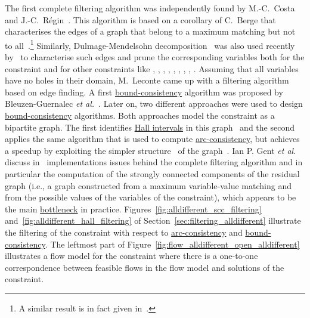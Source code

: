 \begin{ctrdesc}
\item[\pdfmarkup{subject={Algorithm},color=white,markup=Highlight}{Algorithm}{References (or short description) to the filtering algorithm attached to the constraint.}]
The first complete filtering algorithm was independently found by
M.-C.~Costa~\cite{Costa94} and J.-C.~R\'egin~\cite{Regin94}.
This algorithm is based on a corollary of C.~Berge that characterises
the edges of a graph that belong to a maximum
matching but not to all~\cite[page 120]{Berge70}.\footnote{A similar result
is in fact given in~\cite{Petersen1891}.}
Similarly, Dulmage-Mendelsohn decomposition~\cite{DulmageMendelsohn58}
was also used recently by~\cite{Cymer12,CymerPhD13} to characterise such edges and prune
the corresponding variables both for the  constraint
and for other constraints like
\hyperlink{Calldifferent_except_0}{},
\hyperlink{Ccorrespondence}{},
\hyperlink{Cinverse}{},
\hyperlink{Csame}{},
\hyperlink{Cused_by}{},
\hyperlink{Cglobal_cardinality_low_up}{},
\hyperlink{Csoft_alldifferent_var}{},
\hyperlink{Csoft_same_var}{},
\hyperlink{Csoft_used_by_var}{}.
Assuming that all variables have no holes in their
domain, M.~Leconte came up with a filtering algorithm~\cite{Leconte96}
based on edge finding.
A first \hyperlink{bound-consistency}{bound-consistency} algorithm was proposed by
Bleuzen-Guernalec \emph{et al.}~\cite{GuernalecColmerauer97}.
Later on, two different
approaches were used to design \hyperlink{bound-consistency}{bound-consistency}
algorithms. Both approaches model the constraint as a bipartite
graph. The first identifies \hyperlink{Hall_interval}{Hall intervals} in this
graph~\cite{Puget98,LopezOrtizQuimperTrompBeek03} and
the second applies the same algorithm that is used
to compute \hyperlink{arc-consistency}{arc-consistency}, but achieves a speedup by
exploiting the simpler structure~\cite{Glover67} of the graph~\cite{MehlhornThiel00}.
Ian P. Gent \emph{et al.} discuss in~\cite{GentMiguelNightingale08} implementations issues behind the complete filtering
algorithm and in particular the computation of the strongly connected components
of the residual graph (i.e., a graph constructed from a maximum variable\nobreakdash-value
matching and from the possible values of the variables of the  constraint),
which appears to be the main \hyperlink{DFS-bottleneck}{bottleneck} in practice.
Figures~\ref{fig:alldifferent_scc_filtering} and~\ref{fig:alldifferent_hall_filtering}
of Section~\ref{sec:filtering_alldifferent} illustrate the filtering of the  constraint with respect to
\hyperlink{arc-consistency}{arc-consistency} and \hyperlink{bound-consistency}{bound-consistency}.
The leftmost part of Figure~\ref{fig:flow_alldifferent_open_alldifferent}
illustrates a flow model for the  constraint
where there is a one-to-one correspondence between feasible flows in the flow model
and solutions of the  constraint.


\end{ctrdesc}
